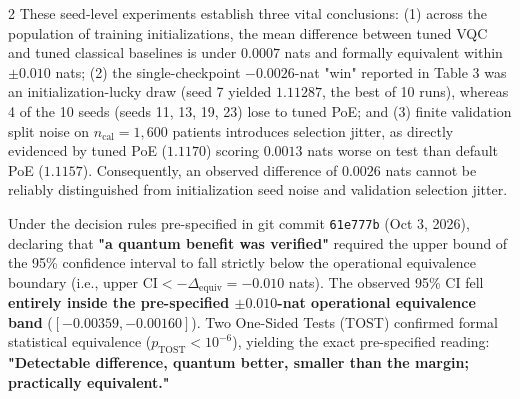 \documentclass[10pt,a4paper,twoside]{article}
\begin{document}
\begin{multicols}{2}
These seed-level experiments establish three vital conclusions: (1) across the population of training initializations, the mean difference between tuned VQC and tuned classical baselines is under $0.0007$ nats and formally equivalent within $\pm 0.010$ nats; (2) the single-checkpoint $-0.0026$-nat "win" reported in Table 3 was an initialization-lucky draw (seed 7 yielded $1.11287$, the best of 10 runs), whereas 4 of the 10 seeds (seeds 11, 13, 19, 23) lose to tuned PoE; and (3) finite validation split noise on $n_{\text{cal}} = 1,600$ patients introduces selection jitter, as directly evidenced by tuned PoE ($1.1170$) scoring $0.0013$ nats worse on test than default PoE ($1.1157$). Consequently, an observed difference of $0.0026$ nats cannot be reliably distinguished from initialization seed noise and validation selection jitter.

Under the decision rules pre-specified in git commit \texttt{61e777b} (Oct 3, 2026), declaring that \textbf{"a quantum benefit was verified"} required the upper bound of the 95\% confidence interval to fall strictly below the operational equivalence boundary (i.e., $\text{upper CI} < -\Delta_{\text{equiv}} = -0.010$ nats). The observed 95\% CI fell \textbf{entirely inside the pre-specified $\pm 0.010$-nat operational equivalence band} ($[-0.00359, -0.00160]$). Two One-Sided Tests (TOST) \cite{schuirmann1987,lakens2017} confirmed formal statistical equivalence ($p_{\text{TOST}} < 10^{-6}$), yielding the exact pre-specified reading: \textbf{"Detectable difference, quantum better, smaller than the margin; practically equivalent."}


\end{multicols}
\end{document}
